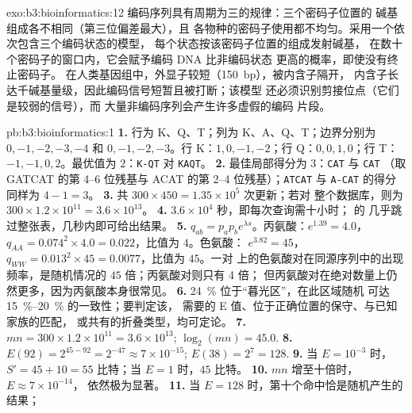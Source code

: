 \begin{solution}{exo:b3:bioinformatics:12}
编码序列具有周期为三的规律：三个密码子位置的
碱基组成各不相同（第三位偏差最大），且
各物种的密码子使用都不均匀。采用一个依次包含三个编码状态的模型，
每个状态按该密码子位置的组成发射碱基，
在数十个密码子的窗口内，它会赋予编码 DNA 比非编码状态
更高的概率，即使没有终止密码子。
在人类基因组中，外显子较短（\qty{150}{bp}），被内含子隔开，
内含子长达千碱基量级，因此编码信号短暂且被打断；该模型
还必须识别剪接位点（它们是较弱的信号），而
大量非编码序列会产生许多虚假的编码
片段。
\end{solution}

\begin{solution}{pb:b3:bioinformatics:1}
\textbf{1.} 行为 K、Q、T；列为 K、A、Q、T；边界分别为 $0,-1,-2,-3,-4$
和 $0,-1,-2,-3$。行 K：$1, 0, -1, -2$；行 Q：$0, 0, 1, 0$；行 T：
$-1, -1, 0, 2$。最优值为 $2$：\texttt{K-QT} 对 \texttt{KAQT}。
\textbf{2.} 最佳局部得分为 $3$：\texttt{CAT} 与 \texttt{CAT}
（取 GATCAT 的第 4--6 位残基与 ACAT 的第 2--4 位残基）；\texttt{ATCAT} 与
\texttt{A-CAT} 的得分同样为 $4 - 1 = 3$。
\textbf{3.} 共 $300\times 450 = 1.35\times 10^{5}$ 次更新；若对
整个数据库，则为 $300\times 1.2\times 10^{11} = 3.6\times 10^{13}$。
\textbf{4.} $3.6\times 10^{4}$ 秒，即每次查询需十小时； 的
几乎跳过整张表，几秒内即可给出结果。
\textbf{5.} $q_{ab} = p_{a}p_{b}e^{\lambda s}$。丙氨酸：$e^{1.39} = 4.0$，
$q_{AA} = 0.074^{2}\times 4.0 = 0.022$，比值为 $4$。色氨酸：
$e^{3.82} = 45$，$q_{WW} = 0.013^{2}\times 45 = 0.0077$，比值为 $45$。一对
上的色氨酸对在同源序列中的出现频率，是随机情况的
$45$ 倍；丙氨酸对则只有 4 倍；
但丙氨酸对在绝对数量上仍然更多，因为丙氨酸本身很常见。
\textbf{6.} \qty{24}{\%} 位于“暮光区”，在此区域随机
可达 \qtyrange{15}{20}{\%} 的一致性；要判定该，
需要的 E 值、位于正确位置的保守、与已知家族的匹配，
或共有的折叠类型，均可定论。
\textbf{7.} $mn = 300\times 1.2\times 10^{11} = 3.6\times 10^{13}$;
$\log_{2}(mn) = 45.0$.
\textbf{8.} $E(92) = 2^{45 - 92} = 2^{-47} \approx 7\times 10^{-15}$;
$E(38) = 2^{7} = 128$.
\textbf{9.} 当 $E = 10^{-3}$ 时，$S' = 45 + 10 = 55$ 比特；当 $E = 1$ 时，$45$
比特。
\textbf{10.} $mn$ 增至十倍时，$E \approx 7\times 10^{-14}$，
依然极为显著。
\textbf{11.} 当 $E = 128$ 时，第十个命中恰是随机产生的结果；

\end{solution}
